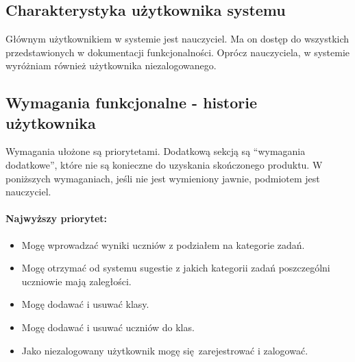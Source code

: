 \documentclass[polish,12pt]{aghthesis}
\author{Andrzej Sołtysik}
\date{\the\year}
\begin{document}
\maketitle

\section{\SectionTitleProjectVision}
\label{sec:cel-wizja}

\section{\SectionTitleScope}
\label{sec:zakres-funkcjonalnosci}

\subsection{Charakterystyka użytkownika systemu}

Głównym użytkownikiem w systemie jest nauczyciel. Ma on dostęp do wszystkich przedstawionych w dokumentacji funkcjonalności. Oprócz nauczyciela, w systemie wyróżniam również użytkownika niezalogowanego. 

\subsection{Wymagania funkcjonalne - historie użytkownika}

Wymagania ułożone są priorytetami. Dodatkową sekcją są ``wymagania dodatkowe'', które nie są konieczne do uzyskania skończonego produktu. W poniższych wymaganiach, jeśli nie jest wymieniony jawnie, podmiotem jest nauczyciel.

\paragraph{Najwyższy priorytet:}
\begin{itemize}
	\item{Mogę wprowadzać wyniki uczniów z podziałem na kategorie zadań.}
	\item{Mogę otrzymać od systemu sugestie z jakich kategorii zadań poszczególni uczniowie mają zaległości.}
	\item{Mogę dodawać i usuwać klasy.}
	\item{Mogę dodawać i usuwać uczniów do klas.}
	\item{Jako niezalogowany użytkownik mogę się zarejestrować i zalogować.}
\end{itemize}
\end{document}
